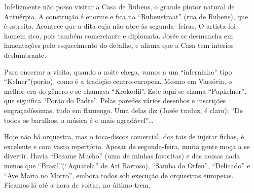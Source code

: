 Infelizmente não posso visitar a Casa de Rubens, o grande pintor natural de Antuérpia. A construção é enorme e fica na “Rubenstraat” (rua de Rubens), que é estreita. Acontece que a dita cuja não abre às segunda- feiras. O artista foi homem rico, pois também comerciante e diplomata. Josée se desmancha em lamentações pelo esquecimento do detalhe, e afirma que a Casa tem interior deslumbrante.

Para encerrar a visita, quando a noite chega, vamos a um “inferninho” tipo “Kelner”(porão), como é a tradição centro-europeia. Mesmo em Varsóvia, o melhor era do gênero e se chamava “Krokodil”. Este aqui se chama “Papkelner”, que significa “Porão do Padre”. Pelas paredes vários desenhos e inscrições engraçadíssimas, tudo em flamengo. Uma delas diz (Josée traduz, é claro): “De todos os barulhos, a música é o mais agradável”\ldots

Hoje não há orquestra, mas o toca-discos comercial, dos tais de injetar fichas, é excelente e com vasto repertório. Apesar de segunda-feira, muita gente moça a se divertir. Havia “Besame Mucho” (uma de minhas favoritas) e das nossas nada menos que “Brasil”(“Aquarela” de Ari Barroso), “Samba do Orfeu”, “Delicado” e “Ave Maria no Morro”, embora todos sob execução de orquestras europeias. Ficamos lá até a hora de voltar, no último trem.
